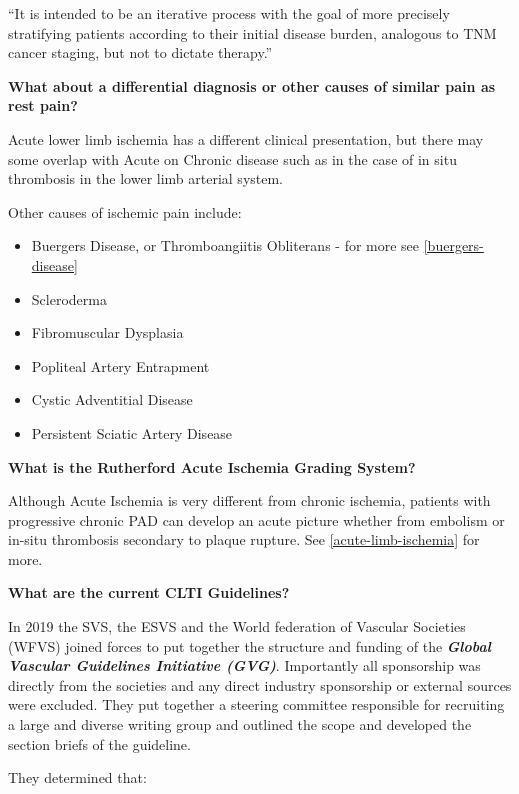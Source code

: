 \documentclass[
]{book}
\begin{document}
``It is intended to be an iterative process with the goal of more
precisely stratifying patients according to their initial disease
burden, analogous to TNM cancer staging, but not to dictate therapy.''

\textbf{What about a differential diagnosis or other causes of similar pain as
rest pain?}

Acute lower limb ischemia has a different clinical presentation, but
there may some overlap with Acute on Chronic disease such as in the case of
in situ thrombosis in the lower limb arterial system.

Other causes of ischemic pain include:

\begin{itemize}
\item
  Buergers Disease, or Thromboangiitis Obliterans - for more see
  \ref{buergers-disease}
\item
  Scleroderma
\item
  Fibromuscular Dysplasia
\item
  Popliteal Artery Entrapment
\item
  Cystic Adventitial Disease
\item
  Persistent Sciatic Artery Disease
\end{itemize}

\textbf{What is the Rutherford Acute Ischemia Grading System?}

Although Acute Ischemia is very different from chronic ischemia,
patients with progressive chronic PAD can develop an acute picture
whether from embolism or in-situ thrombosis secondary to plaque rupture.
See \ref{acute-limb-ischemia} for more.

\textbf{What are the current CLTI Guidelines?}

In 2019 the SVS, the ESVS and the World federation of Vascular Societies
(WFVS) joined forces to put together the structure and funding of the
\textbf{\emph{Global Vascular Guidelines Initiative (GVG)}}. Importantly all
sponsorship was directly from the societies and any direct industry
sponsorship or external sources were excluded. They put together a steering
committee responsible for recruiting a large and diverse writing group and
outlined the scope and developed the section briefs of the guideline.

They determined that:
\end{document}
